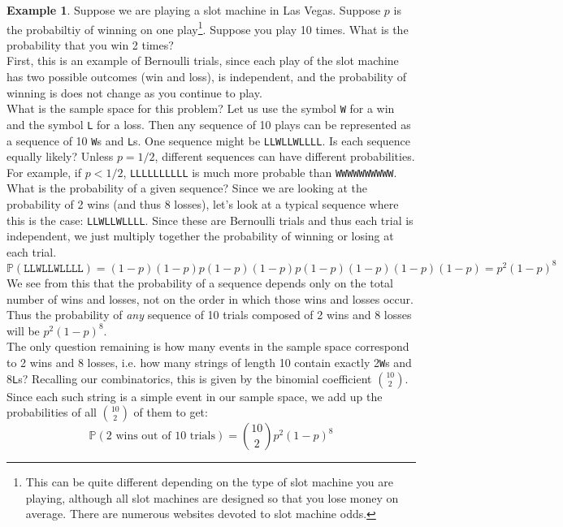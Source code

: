 \documentclass[12pt]{article}
\theoremstyle{definition}
\newtheorem*{example}{Example}
\theoremstyle{remark}
\def\P{{\mathbb P}}
\begin{document}
\begin{example}Suppose we are playing a slot machine in Las Vegas. Suppose $p$ is the probabiltiy of winning on one play\footnote{This can be quite different depending on the type of slot machine you are playing, although all slot machines are designed so that you lose money on average. There are numerous websites devoted to slot machine odds.}. Suppose you play 10 times. What is the probability that you win 2 times?\\

First, this is an example of Bernoulli trials, since each play of the slot machine has two possible outcomes (win and loss), is independent, and the probability of winning is does not change as you continue to play. \\

What is the sample space for this problem? Let us use the symbol \texttt{W} for a win and the symbol \texttt{L} for a loss. Then any sequence of 10 plays can be represented as a sequence of 10 \texttt{W}s and \texttt{L}s. One sequence might be \texttt{LLWLLWLLLL}. Is each sequence equally likely? Unless $p = 1/2$, different sequences can have different probabilities. For example, if $p < 1/2$, \texttt{LLLLLLLLLL} is much more probable than \texttt{WWWWWWWWWW}. What is the probability of a given sequence? Since we are looking at the probability of 2 wins (and thus 8 losses), let's look at a typical sequence where this is the case: \texttt{LLWLLWLLLL}. Since these are Bernoulli trials and thus each trial is independent, we just multiply together the probability of winning or losing at each trial.
\[
\P(\texttt{LLWLLWLLLL}) = (1-p)(1-p)p(1-p)(1-p)p(1-p)(1-p)(1-p)(1-p) = p^2(1-p)^8
\]
We see from this that the probability of a sequence depends only on the total number of wins and losses, not on the order in which those wins and losses occur. Thus the probability of \emph{any} sequence of 10 trials composed of 2 wins and 8 losses will be $p^2(1-p)^8$.\\

The only question remaining is how many events in the sample space correspond to 2 wins and 8 losses, i.e. how many strings of length 10 contain exactly 2\texttt{W}s and 8\texttt{L}s? Recalling our combinatorics, this is given by the binomial coefficient $\binom{10}{2}$. Since each such string is a simple event in our sample space, we add up the probabilities of all $\binom{10}{2}$ of them to get:
\[
\P(\text{2 wins out of 10 trials})= \binom{10}{2} p^2 (1-p)^8
\]  
\end{example}
\end{document}
